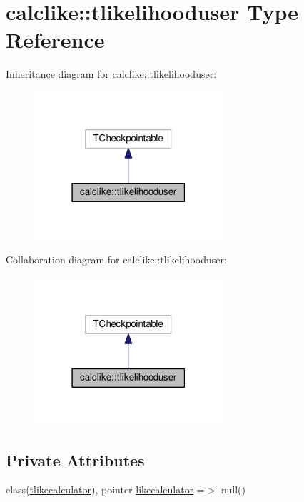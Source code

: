 \hypertarget{structcalclike_1_1tlikelihooduser}{}\section{calclike\+:\+:tlikelihooduser Type Reference}
\label{structcalclike_1_1tlikelihooduser}


Inheritance diagram for calclike\+:\+:tlikelihooduser\+:
\nopagebreak
\begin{figure}[H]
\begin{center}
\leavevmode
\includegraphics[width=198pt]{structcalclike_1_1tlikelihooduser__inherit__graph}
\end{center}
\end{figure}


Collaboration diagram for calclike\+:\+:tlikelihooduser\+:
\nopagebreak
\begin{figure}[H]
\begin{center}
\leavevmode
\includegraphics[width=198pt]{structcalclike_1_1tlikelihooduser__coll__graph}
\end{center}
\end{figure}
\subsection*{Private Attributes}
\begin{DoxyCompactItemize}
\item 
class(\mbox{\hyperlink{structcalclike_1_1tlikecalculator}{tlikecalculator}}), pointer \mbox{\hyperlink{structcalclike_1_1tlikelihooduser_a071410af228e3ca89c05947b5b7d9aec}{likecalculator}} =$>$ null()
\end{DoxyCompactItemize}


